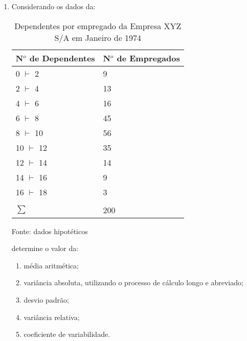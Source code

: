 \begin{enumerate}
\item Considerando os dados da:
	\begin{table}[!htb]
	\centering
	\caption{Dependentes por empregado da Empresa XYZ S/A  em Janeiro de 1974}
	\vspace{0.5cm}
	\begin{tabular}{ll}
	N$^o$ de Dependentes & N$^o$ de Empregados \\
	\hline 
	0 $\vdash$ 2 & 9 \\
	2 $\vdash$ 4 & 13 \\
	4 $\vdash$ 6 & 16 \\
	6 $\vdash$ 8 & 45  \\
	8 $\vdash$ 10 & 56 \\
	10 $\vdash$ 12 & 35  \\
	12 $\vdash$ 14 & 14  \\
	14 $\vdash$ 16 & 9 \\
	16 $\vdash$ 18 & 3 \\ \\ \hline 
	$\sum$ & 200  \\ \hline 
	\end{tabular}
	\newline Fonte: dados hipotéticos
	\end{table}
	determine o valor da:
	\begin{enumerate}
		\item média aritmética;
		\item variância absoluta, utilizando o processo de cálculo longo e abreviado;
		\item desvio padrão;
		\item variância relativa;
		\item coeficiente de variabilidade.
	\end{enumerate}


\end{enumerate}
